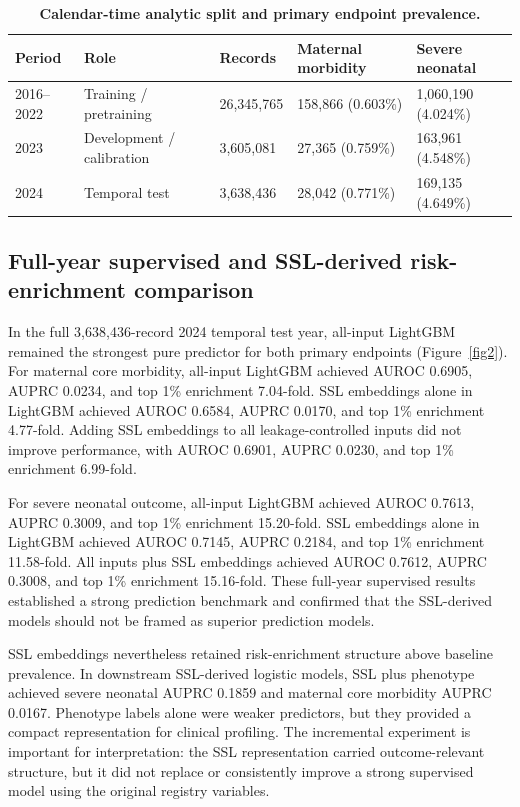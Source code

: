 \documentclass[pdflatex,sn-vancouver-num]{sn-jnl}
\begin{document}
\begin{table}[!htbp]
\caption{\textbf{Calendar-time analytic split and primary endpoint prevalence.}}
\label{tab:cohort-endpoints}
\centering
\scriptsize
\setlength{\tabcolsep}{3pt}
\begin{tabular*}{\textwidth}{@{\extracolsep{\fill}}lllll@{}}
\toprule
Period & Role & Records & Maternal morbidity & Severe neonatal \\
\midrule
2016--2022 & Training / pretraining & 26,345,765 & 158,866 (0.603\%) & 1,060,190 (4.024\%) \\
2023 & Development / calibration & 3,605,081 & 27,365 (0.759\%) & 163,961 (4.548\%) \\
2024 & Temporal test & 3,638,436 & 28,042 (0.771\%) & 169,135 (4.649\%) \\
\bottomrule
\end{tabular*}
\end{table}

\subsection{Full-year supervised and SSL-derived risk-enrichment comparison}\label{subsec:risk-comparison}

In the full 3,638,436-record 2024 temporal test year, all-input LightGBM remained the strongest pure predictor for both primary endpoints (Figure~\ref{fig2}). For maternal core morbidity, all-input LightGBM achieved AUROC 0.6905, AUPRC 0.0234, and top 1\% enrichment 7.04-fold. SSL embeddings alone in LightGBM achieved AUROC 0.6584, AUPRC 0.0170, and top 1\% enrichment 4.77-fold. Adding SSL embeddings to all leakage-controlled inputs did not improve performance, with AUROC 0.6901, AUPRC 0.0230, and top 1\% enrichment 6.99-fold.

For severe neonatal outcome, all-input LightGBM achieved AUROC 0.7613, AUPRC 0.3009, and top 1\% enrichment 15.20-fold. SSL embeddings alone in LightGBM achieved AUROC 0.7145, AUPRC 0.2184, and top 1\% enrichment 11.58-fold. All inputs plus SSL embeddings achieved AUROC 0.7612, AUPRC 0.3008, and top 1\% enrichment 15.16-fold. These full-year supervised results established a strong prediction benchmark and confirmed that the SSL-derived models should not be framed as superior prediction models.

SSL embeddings nevertheless retained risk-enrichment structure above baseline prevalence. In downstream SSL-derived logistic models, SSL plus phenotype achieved severe neonatal AUPRC 0.1859 and maternal core morbidity AUPRC 0.0167. Phenotype labels alone were weaker predictors, but they provided a compact representation for clinical profiling. The incremental experiment is important for interpretation: the SSL representation carried outcome-relevant structure, but it did not replace or consistently improve a strong supervised model using the original registry variables.
\end{document}
